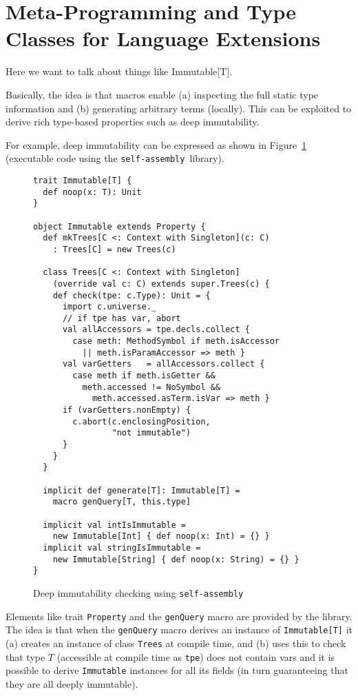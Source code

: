 \documentclass[preprint]{sigplanconf}
\newcommand{\selfassembly}{\texttt{self-assembly~}}
\begin{document}
\section{Meta-Programming and Type Classes for Language Extensions}
\label{sec:language-extensions}

Here we want to talk about things like Immutable[T].

Basically, the idea is that macros enable (a) inspecting the full static type
information and (b) generating arbitrary terms (locally). This can be
exploited to derive rich type-based properties such as deep immutability.

For example, deep immutability can be expressed as shown in
Figure~\ref{fig:immutable} (executable code using the \selfassembly library).

\begin{figure}
\centering
\begin{lstlisting}
trait Immutable[T] {
  def noop(x: T): Unit
}

object Immutable extends Property {
  def mkTrees[C <: Context with Singleton](c: C)
    : Trees[C] = new Trees(c)

  class Trees[C <: Context with Singleton]
    (override val c: C) extends super.Trees(c) {
    def check(tpe: c.Type): Unit = {
      import c.universe._
      // if tpe has var, abort
      val allAccessors = tpe.decls.collect {
        case meth: MethodSymbol if meth.isAccessor
          || meth.isParamAccessor => meth }
      val varGetters   = allAccessors.collect {
        case meth if meth.isGetter &&
          meth.accessed != NoSymbol &&
            meth.accessed.asTerm.isVar => meth }
      if (varGetters.nonEmpty) {
        c.abort(c.enclosingPosition,
                "not immutable")
      }
    }
  }

  implicit def generate[T]: Immutable[T] =
    macro genQuery[T, this.type]

  implicit val intIsImmutable =
    new Immutable[Int] { def noop(x: Int) = {} }
  implicit val stringIsImmutable =
    new Immutable[String] { def noop(x: String) = {} }
}
\end{lstlisting}
  \caption{Deep immutability checking using \selfassembly}
  \label{fig:immutable}
\end{figure}

Elements like trait \verb|Property| and the \verb|genQuery| macro are provided by the
library. The idea is that when the \verb|genQuery| macro derives an instance of
\verb|Immutable[T]| it (a) creates an instance of class \verb|Trees| at compile time, and
(b) uses this to check that type $T$ (accessible at compile time as \verb|tpe|) does
not contain vars and it is possible to derive \verb|Immutable| instances for all its
fields (in turn guaranteeing that they are all deeply immutable).
\end{document}
